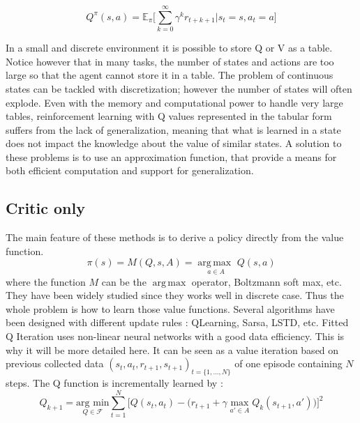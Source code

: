 \begin{equation}
  Q^\pi(s, a) = \mathbb{E}_\pi \Big[ \sum_{k=0}^{\infty} \gamma^k r_{t+k+1} \Big| s_t = s, a_t = a \Big]
\end{equation}

In a small and discrete environment it is possible to store Q or V as a table.
Notice however that in many tasks, the number of states and actions are
too large so that the agent cannot store it in a table. The problem of
continuous states can be tackled with discretization; however the number of
states will often explode. Even with the memory and computational power to
handle very large tables, reinforcement learning with Q values represented in the
tabular form suffers from the lack of generalization, meaning that what is learned
in a state does not impact the knowledge about the value of similar states.
A solution to these problems is to use an approximation function, that provide
a means for both efficient computation and support for generalization.


% 



\subsection{Critic only}
The main feature of these methods is to derive a policy directly from the value function.
\begin{equation}
 \pi(s) = M(Q, s, A) = \underset{a \in A}{\operatorname{arg\,max\ }} Q(s,a)
\end{equation}
where the function $M$ can be the $\operatorname{arg\,max}$ operator, Boltzmann soft max, etc.
They have been widely studied since they works well in discrete case.
Thus the whole problem is how to learn those value functions.
Several algorithms have been designed with different update rules : QLearning, Sarsa, LSTD, etc.
Fitted Q Iteration \cite{Riedmiller2005} uses non-linear neural networks with a good data efficiency.
This is why it will be more detailed here.
It can be seen as a value iteration based on previous collected data $(s_t, a_t,r_{t+1}, s_{t+1})_{t=\{1,...,N\}}$ of one episode containing $N$ steps.
The Q function is incrementally learned by : 
\begin{equation}
 Q_{k+1} = \underset{Q \in \mathcal{F}}{\text{arg min}} \sum_{t=1}^{N} \Big[ Q(s_t, a_t) - \big( r_{t+1} + \gamma \underset{a' \in A}{\text{ max }} Q_k(s_{t+1}, a') \big) \Big]^2
\end{equation}

